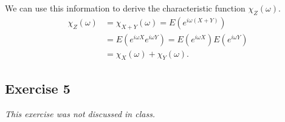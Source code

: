 \documentclass[../main/Notes.tex]{subfiles}
\begin{document}
We can use this information to derive the characteristic function $\chi_Z(\omega)$.
\begin{align*}
\chi_Z(\omega) &= \chi_{X+Y}(\omega) = E(e^{i\omega(X+Y)}) \\
               &= E(e^{i\omega X}e^{i\omega Y}) =E(e^{i\omega X})E(e^{i\omega Y})\\
               &=\chi_X(\omega) + \chi_Y(\omega).
\end{align*}

\subsection*{Exercise 5}
\emph{This exercise was not discussed in class.}
\end{document}
